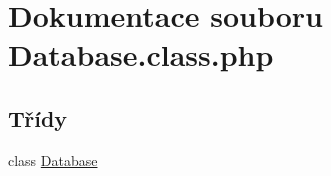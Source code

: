 \hypertarget{_database_8class_8php}{\section{Dokumentace souboru Database.\-class.\-php}
\label{_database_8class_8php}
}
\subsection*{Třídy}
\begin{DoxyCompactItemize}
\item 
class \hyperlink{class_database}{Database}
\end{DoxyCompactItemize}
